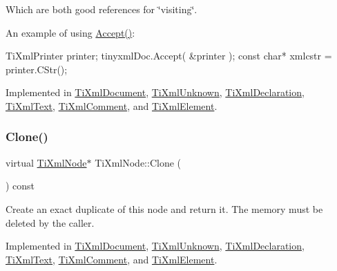 Which are both good references for \char`\"{}visiting\char`\"{}.

An example of using \hyperlink{class_ti_xml_node_acc0f88b7462c6cb73809d410a4f5bb86}{Accept()}\+: \begin{DoxyVerb}TiXmlPrinter printer;
tinyxmlDoc.Accept( &printer );
const char* xmlcstr = printer.CStr();
\end{DoxyVerb}
 

Implemented in \hyperlink{class_ti_xml_document_a8ddd6eec722cbd25900bbac664909bac}{Ti\+Xml\+Document}, \hyperlink{class_ti_xml_unknown_aafdf1b2d4f561979c7907bad91004999}{Ti\+Xml\+Unknown}, \hyperlink{class_ti_xml_declaration_aa1b6bade6c989407ce9881bdfc73c1e6}{Ti\+Xml\+Declaration}, \hyperlink{class_ti_xml_text_af65964326eac4640bfb97d4622fa0de2}{Ti\+Xml\+Text}, \hyperlink{class_ti_xml_comment_ac894241530d1d266131a5026cb251a95}{Ti\+Xml\+Comment}, and \hyperlink{class_ti_xml_element_a01d33358cce9d1817b557d314dda3779}{Ti\+Xml\+Element}.

\hypertarget{class_ti_xml_node_a4508cc3a2d7a98e96a54cc09c37a78a4}{}\label{class_ti_xml_node_a4508cc3a2d7a98e96a54cc09c37a78a4} 
\subsubsection{\texorpdfstring{Clone()}{Clone()}}
{\footnotesize\ttfamily virtual \hyperlink{class_ti_xml_node}{Ti\+Xml\+Node}$\ast$ Ti\+Xml\+Node\+::\+Clone (\begin{DoxyParamCaption}{ }\end{DoxyParamCaption}) const\hspace{0.3cm}{\ttfamily [pure virtual]}}

Create an exact duplicate of this node and return it. The memory must be deleted by the caller. 

Implemented in \hyperlink{class_ti_xml_document_a46a4dda6c56eb106d46d4046ae1e5353}{Ti\+Xml\+Document}, \hyperlink{class_ti_xml_unknown_a3dea7689de5b1931fd6657992948fde0}{Ti\+Xml\+Unknown}, \hyperlink{class_ti_xml_declaration_a35dc1455f69b79e81cae28e186944610}{Ti\+Xml\+Declaration}, \hyperlink{class_ti_xml_text_a98a20d7a4f1c1478e25e34921be24bfe}{Ti\+Xml\+Text}, \hyperlink{class_ti_xml_comment_a1f9f06e2ed3f77875093436193b16c16}{Ti\+Xml\+Comment}, and \hyperlink{class_ti_xml_element_a810ea8fa40844c01334e5af2a26794cb}{Ti\+Xml\+Element}.

\hypertarget{class_ti_xml_node_ae98c367f664890c4b5a5183481ec128a}{}\label{class_ti_xml_node_ae98c367f664890c4b5a5183481ec128a} 
